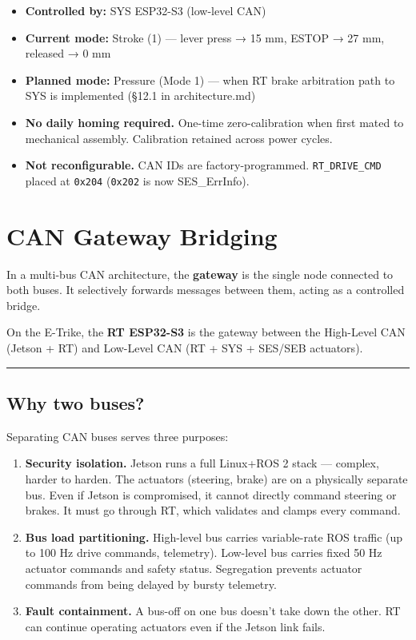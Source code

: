 \documentclass[12pt,a4paper,oneside]{report}
\providecommand{\tightlist}{\setlength{\itemsep}{0pt}\setlength{\parskip}{0pt}}
\begin{document}
\begin{itemize}
\tightlist
\item
  \textbf{Controlled by:} SYS ESP32-S3 (low-level CAN)
\item
  \textbf{Current mode:} Stroke (1) --- lever press → 15 mm, ESTOP → 27 mm,
  released → 0 mm
\item
  \textbf{Planned mode:} Pressure (Mode 1) --- when RT brake arbitration path to
  SYS is implemented (§12.1 in architecture.md)
\item
  \textbf{No daily homing required.} One-time zero-calibration when first mated
  to mechanical assembly. Calibration retained across power cycles.
\item
  \textbf{Not reconfigurable.} CAN IDs are factory-programmed.
  \texttt{RT\_DRIVE\_CMD} placed at \texttt{0x204} (\texttt{0x202} is now
  SES\_ErrInfo).
\end{itemize}


\chapter{CAN Gateway Bridging}\label{can-gateway-bridging}

In a multi-bus CAN architecture, the \textbf{gateway} is the single node
connected to both buses. It selectively forwards messages between them, acting
as a controlled bridge.

On the E-Trike, the \textbf{RT ESP32-S3} is the gateway between the High-Level
CAN (Jetson + RT) and Low-Level CAN (RT + SYS + SES/SEB actuators).

\begin{center}\rule{0.5\linewidth}{0.5pt}\end{center}

\section{Why two buses?}\label{why-two-buses}

Separating CAN buses serves three purposes:

\begin{enumerate}
\def\labelenumi{\arabic{enumi}.}
\item
  \textbf{Security isolation.} Jetson runs a full Linux+ROS 2 stack --- complex,
  harder to harden. The actuators (steering, brake) are on a physically separate
  bus. Even if Jetson is compromised, it cannot directly command steering or
  brakes. It must go through RT, which validates and clamps every command.
\item
  \textbf{Bus load partitioning.} High-level bus carries variable-rate ROS
  traffic (up to 100 Hz drive commands, telemetry). Low-level bus carries fixed
  50 Hz actuator commands and safety status. Segregation prevents actuator
  commands from being delayed by bursty telemetry.
\item
  \textbf{Fault containment.} A bus-off on one bus doesn't take down the other.
  RT can continue operating actuators even if the Jetson link fails.
\end{enumerate}
\end{document}
